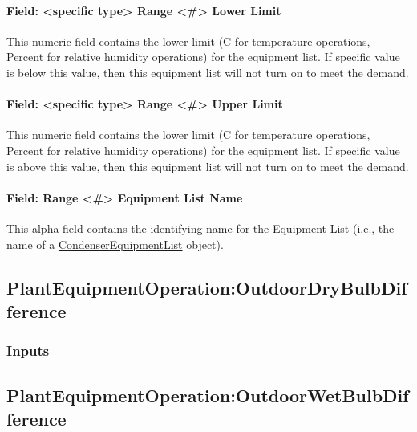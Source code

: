 \paragraph{Field: \textless{}specific type\textgreater{} Range \textless{}\#\textgreater{} Lower Limit}\label{field-specific-type-range-lower-limit}

This numeric field contains the lower limit (C for temperature operations, Percent for relative humidity operations) for the equipment list. If specific value is below this value, then this equipment list will not turn on to meet the demand.

\paragraph{Field: \textless{}specific type\textgreater{} Range \textless{}\#\textgreater{} Upper Limit}\label{field-specific-type-range-upper-limit}

This numeric field contains the lower limit (C for temperature operations, Percent for relative humidity operations) for the equipment list. If specific value is above this value, then this equipment list will not turn on to meet the demand.

\paragraph{Field: Range \textless{}\#\textgreater{} Equipment List Name}\label{field-range-equipment-list-name-1}

This alpha field contains the identifying name for the Equipment List (i.e., the name of a \hyperref[condenserequipmentlist]{CondenserEquipmentList} object).

\subsection{PlantEquipmentOperation:OutdoorDryBulbDifference}\label{plantequipmentoperationoutdoordrybulbdifference}

\subsubsection{Inputs}\label{inputs-9-013}

\subsection{PlantEquipmentOperation:OutdoorWetBulbDifference}\label{plantequipmentoperationoutdoorwetbulbdifference}

